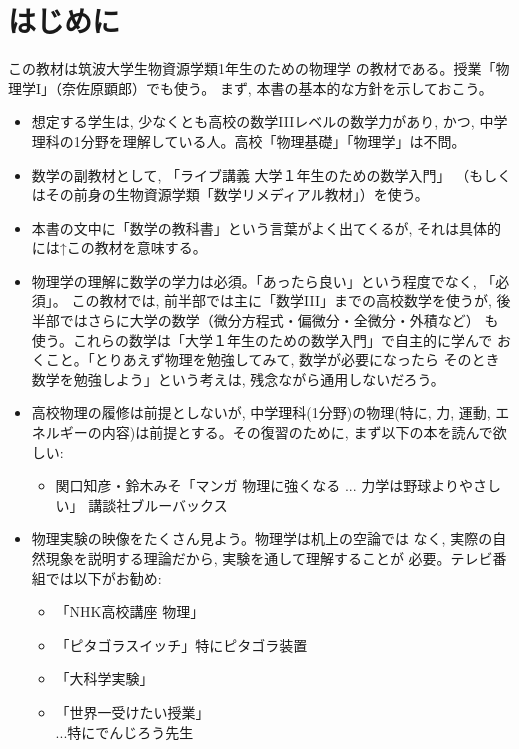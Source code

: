 \chapter{はじめに}
%

この教材は筑波大学生物資源学類1年生のための物理学
の教材である。授業「物理学I」（奈佐原顕郎）でも使う。
まず, 本書の基本的な方針を示しておこう。

\begin{itemize}
\item 想定する学生は, 少なくとも高校の数学IIIレベルの数学力があり, かつ, 
中学理科の1分野を理解している人。高校「物理基礎」「物理学」は不問。
\item 数学の副教材として, 「ライブ講義 大学１年生のための数学入門」
（もしくはその前身の生物資源学類「数学リメディアル教材」）を使う。
\item 本書の文中に「数学の教科書」という言葉がよく出てくるが, それは具体的には↑この教材を意味する。
\item 物理学の理解に数学の学力は必須。「あったら良い」という程度でなく, 「必須」。
この教材では, 前半部では主に「数学III」までの高校数学を使うが, 
後半部ではさらに大学の数学（微分方程式・偏微分・全微分・外積など）
も使う。これらの数学は「大学１年生のための数学入門」で自主的に学んで
おくこと。「とりあえず物理を勉強してみて, 数学が必要になったら
そのとき数学を勉強しよう」という考えは, 残念ながら通用しないだろう。
\item 高校物理の履修は前提としないが, 中学理科(1分野)の物理(特に, 力, 運動, エネルギーの内容)は前提とする。その復習のために, まず以下の本を読んで欲しい:
\begin{itemize}
\item 関口知彦・鈴木みそ「マンガ 物理に強くなる ... 力学は野球よりやさしい」 講談社ブルーバックス
\end{itemize}
\item 物理実験の映像をたくさん見よう。物理学は机上の空論では
なく, 実際の自然現象を説明する理論だから, 実験を通して理解することが
必要。テレビ番組では以下がお勧め: 
\begin{itemize}
\item 「NHK高校講座 物理」
\item 「ピタゴラスイッチ」特にピタゴラ装置
\item 「大科学実験」
\item 「世界一受けたい授業」\\...特にでんじろう先生

\end{itemize}
\end{itemize}
